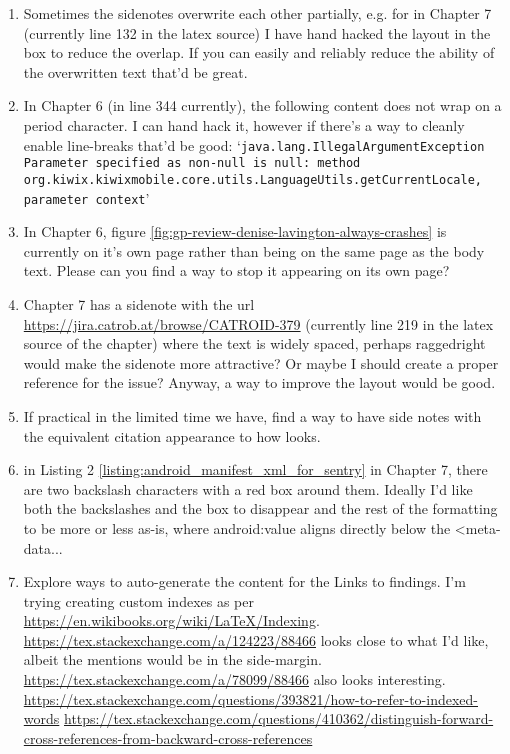 \begin{enumerate}
    \item Sometimes the sidenotes overwrite each other partially, e.g. for  in Chapter 7 (currently line 132 in the latex source) I have hand hacked the layout in the box to reduce the overlap. If you can easily and reliably reduce the ability of the overwritten text that'd be great.
    \item In Chapter 6 (in line 344 currently), the following  content does not wrap on a period character. I can hand hack it, however if there's a way to cleanly enable line-breaks that'd be good: `\texttt{java.lang.IllegalArgumentException Parameter specified as non-null is null: method org.kiwix.kiwixmobile.core.utils.LanguageUtils.getCurrentLocale, parameter context}'
    \item In Chapter 6, figure \ref{fig:gp-review-denise-lavington-always-crashes} is currently on it's own page rather than being on the same page as the body text. Please can you find a way to stop it appearing on its own page?  
    \item Chapter 7 has a sidenote with the url \url{https://jira.catrob.at/browse/CATROID-379} (currently line 219 in the latex source of the chapter) where the text is widely spaced, perhaps raggedright would make the sidenote more attractive? Or maybe I should create a proper reference for the issue? Anyway, a way to improve the layout would be good.
    \item If practical in the limited time we have, find a way to have side notes with the equivalent citation appearance to how  looks.
    \item in Listing 2 \ref{listing:android_manifest_xml_for_sentry} in Chapter 7, there are two backslash characters with a red box around them. Ideally I'd like both the backslashes and the box to disappear and the rest of the formatting to be more or less as-is, where android:value aligns directly below the <meta-data... 
    \item Explore ways to auto-generate the content for the Links to findings. I'm trying creating custom indexes as per \url{https://en.wikibooks.org/wiki/LaTeX/Indexing}. \url{https://tex.stackexchange.com/a/124223/88466} looks close to what I'd like, albeit the mentions would be in the side-margin. \url{https://tex.stackexchange.com/a/78099/88466} also looks interesting. \url{https://tex.stackexchange.com/questions/393821/how-to-refer-to-indexed-words} \url{https://tex.stackexchange.com/questions/410362/distinguish-forward-cross-references-from-backward-cross-references}
\end{enumerate}

